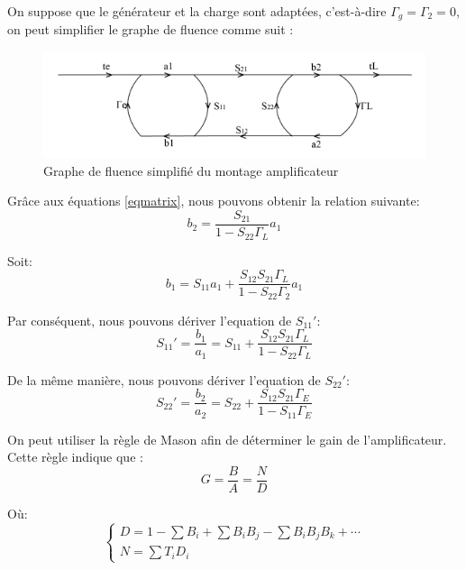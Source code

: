 \documentclass[french]{article}
\begin{document}
On suppose que le générateur et la charge sont adaptées, c’est-à-dire $\Gamma_{g}=\Gamma_{2}=0$, on peut simplifier le graphe de fluence comme suit :

\begin{figure}[H]
	\centering
	\includegraphics[width=0.9\linewidth]{../5SynthAmp/flux_simple}
	\caption{Graphe de fluence simplifié du montage amplificateur}
	\label{fig:flux_simple}
\end{figure}

Grâce aux équations \ref{eqmatrix}, nous pouvons obtenir la relation suivante:
\begin{equation}
	b_{2}=\frac{S_{21}}{1-S_{22}\Gamma_{L}}a_{1}
\end{equation}

Soit: 
\begin{equation}
	b_{1}=S_{11}a_{1}+\frac{S_{12}S_{21}\Gamma_{L}}{1-S_{22}\Gamma_{2}}a_{1}
\end{equation}

Par conséquent, nous pouvons dériver l'equation de ${S_{11}}'$:
\begin{equation}
	{S_{11}}'=\frac{b_{1}}{a_{1}}
	=S_{11}+\frac{S_{12}S_{21}\Gamma_{L}}{1-S_{22}\Gamma_{L}}
\end{equation}

De la même manière, nous pouvons dériver l'equation de ${S_{22}}'$:
\begin{equation}
	{S_{22}}'=\frac{b_{2}}{a_{2}}
	=S_{22}+\frac{S_{12}S_{21}\Gamma_{E}}{1-S_{11}\Gamma_{E}}
\end{equation}

On peut utiliser la règle de Mason afin de déterminer le gain de l’amplificateur. Cette règle indique que :
\begin{equation}
	G=\frac{B}{A}=\frac{N}{D}
\end{equation}

Où:
\begin{equation}
	\left\{\begin{matrix}
		D=1-\sum{B_{i}}+\sum{B_{i}B_{j}}-\sum{B_{i}B_{j}B_{k}}+{\cdots}\\ 
		N=\sum{T_{i}D_{i}}
	\end{matrix}\right.
\end{equation}
\end{document}
